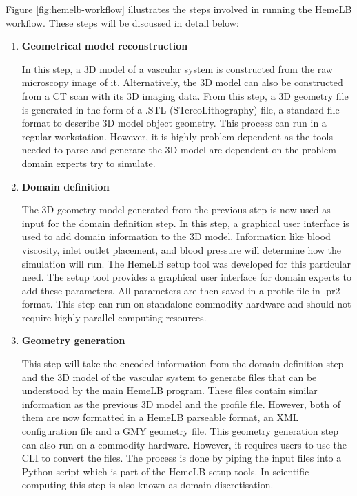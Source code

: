 \vspace{1cm}


Figure \ref{fig:hemelb-workflow} illustrates the steps involved in running the HemeLB workflow. These steps will be discussed in detail below:

\begin{enumerate}

\item{\textbf{Geometrical model reconstruction}}

In this step, a 3D model of a vascular system is constructed from the raw microscopy image of it. Alternatively, the 3D model can also be constructed from a CT scan with its 3D imaging data. From this step, a 3D geometry file is generated in the form of a .STL (STereoLithography) file,  a standard file format to describe 3D model object geometry. This  process can run in a regular workstation. However, it is highly problem dependent as the tools needed to parse and generate the 3D model are dependent on the problem domain experts try to simulate.

\item{\textbf{Domain definition}}

The 3D geometry model generated from the previous step is now used as input for the domain definition step. In this step, a graphical user interface is used to add domain information to the 3D model. Information like blood viscosity, inlet outlet placement, and blood pressure will determine how the simulation will run. The HemeLB setup tool was developed for this particular need. The setup tool provides a graphical user interface for domain experts to add these parameters. All parameters are then saved in a profile file in .pr2 format. This step can run on standalone commodity hardware and should not require highly parallel computing resources.

\item{\textbf{Geometry generation}}

This step will take the encoded information from the domain definition step and the 3D model of the vascular system to generate files that can be understood by the main HemeLB program. These files contain similar information as the previous 3D model and the profile file. However, both of them are now formatted in a HemeLB parseable format, an XML configuration file and a GMY geometry file. This geometry generation step can also run on a commodity hardware. However, it requires users to use the CLI to convert the files. The process is done by piping the input files into a Python script which is part of the HemeLB setup tools. In scientific computing this step is also known as domain discretisation.


\end{enumerate}
